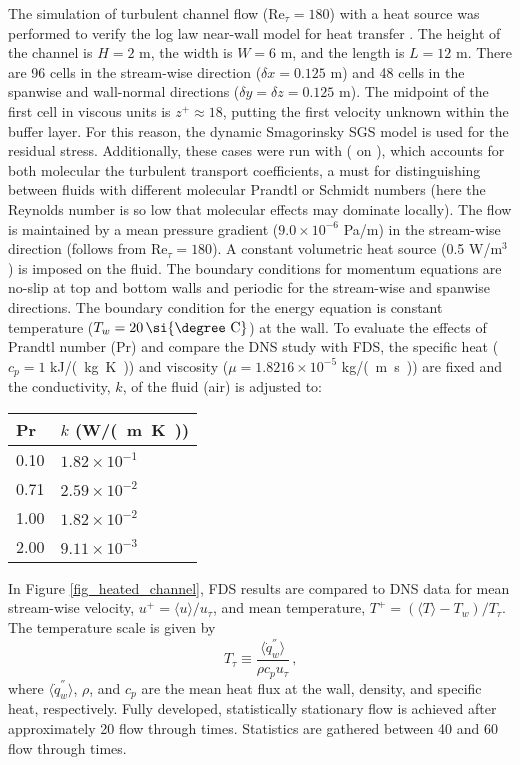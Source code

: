 \documentclass[11pt]{book}
\begin{document}
The simulation of turbulent channel flow (Re$_{\tau}=180$) with a heat source was performed to verify the log law near-wall model for heat transfer \cite{FDS_Tech_Guide}. The height of the channel is $H=2$ m, the width is $W=6$ m, and the length is $L=12$ m. There are 96 cells in the stream-wise direction ($\delta x = 0.125$ m) and 48 cells in the spanwise and wall-normal directions ($\delta y=\delta z=0.125$ m).  The midpoint of the first cell in viscous units is $z^+ \approx 18$, putting the first velocity unknown within the buffer layer. For this reason, the dynamic Smagorinsky SGS model is used for the residual stress. Additionally, these cases were run with ( on ), which accounts for both molecular the turbulent transport coefficients, a must for distinguishing between fluids with different molecular Prandtl or Schmidt numbers (here the Reynolds number is so low that molecular effects may dominate locally).  The flow is maintained by a mean pressure gradient ($9.0 \times 10^{-6}$ Pa/m) in the stream-wise direction (follows from Re$_{\tau}=180$). A constant volumetric heat source (0.5 W/m$^3$) is imposed on the fluid. The boundary conditions for momentum equations are no-slip at top and bottom walls and periodic for the stream-wise and spanwise directions. The boundary condition for the energy equation is constant temperature ($T_w = 20 \,\mbox{\si{\degree C}} $) at the wall. To evaluate the effects of Prandtl number (Pr) and compare the DNS study \cite{Kim:1987} with FDS, the specific heat ($c_p = 1$ \si{kJ/(kg.K)}) and viscosity ($\mu = 1.8216 \times 10^{-5}$ \si{kg/(m.s)}) are fixed and the conductivity, $k$, of the fluid (air) is adjusted to:
\begin{center}
\begin{tabular}{ll}
Pr & $k$ (\si{W/(m.K)}) \\
\hline
0.10 & $1.82 \times 10^{-1}$ \\
0.71 & $2.59 \times 10^{-2}$ \\
1.00 & $1.82 \times 10^{-2}$ \\
2.00 & $9.11 \times 10^{-3}$
\end{tabular}
\end{center}

In Figure \ref{fig_heated_channel}, FDS results are compared to DNS data for mean stream-wise velocity, $u^+ = \langle u \rangle/u_\tau$, and mean temperature, $T^+ = (\langle T \rangle - T_w)/T_\tau$. The temperature scale is given by
\begin{equation}
\label{eqn_friction_temperature}
T_{\tau} \equiv \frac{\langle \dot{q}_w^{''} \rangle}{{\rho}{c_p}{u_{\tau}}} \,\mbox{,}
\end{equation}
where $\langle \dot{q}_w^{''} \rangle$, $\rho$, and $c_p$ are the mean heat flux at the wall, density, and specific heat, respectively.  Fully developed, statistically stationary flow is achieved after approximately 20 flow through times.  Statistics are gathered between 40 and 60 flow through times.
\end{document}
